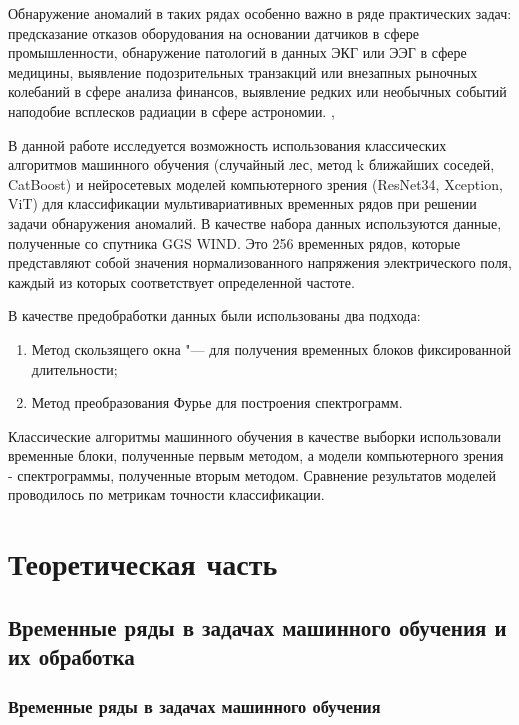 \documentclass[spec, och, diploma]{SCWorks}
\begin{document}
    Обнаружение аномалий в таких рядах особенно важно в ряде практических задач:
    предсказание отказов оборудования на основании датчиков в сфере
    промышленности, обнаружение патологий в данных ЭКГ или ЭЭГ в сфере медицины,
    выявление подозрительных транзакций или внезапных рыночных колебаний в сфере
    анализа финансов, выявление редких или необычных событий наподобие всплесков
    радиации в сфере астрономии. \cite{anomalydetection},
    \cite{anomalydetection2}

    В данной работе исследуется возможность использования классических
    алгоритмов машинного обучения (случайный лес, метод k ближайших соседей,
    CatBoost) и нейросетевых моделей компьютерного зрения (ResNet34, Xception,
    ViT) для классификации мультивариативных временных рядов при решении задачи
    обнаружения аномалий. В качестве набора данных используются данные,
    полученные со спутника GGS WIND. Это 256 временных рядов, которые
    представляют собой значения нормализованного напряжения электрического поля,
    каждый из которых соответствует определенной частоте.
    
    В качестве предобработки данных были использованы два подхода:
    \begin{enumerate}
        \item Метод скользящего окна "--- для получения временных блоков
        фиксированной длительности;
        \item Метод преобразования Фурье для построения спектрограмм.
    \end{enumerate}
    
    Классические алгоритмы машинного обучения в качестве выборки использовали
    временные блоки, полученные первым методом, а модели компьютерного зрения -
    спектрограммы, полученные вторым методом. Сравнение результатов моделей
    проводилось по метрикам точности классификации.

\section{Теоретическая часть}

    \subsection{Временные ряды в задачах машинного обучения и их обработка}
    
        \subsubsection{Временные ряды в задачах машинного обучения}
\end{document}
